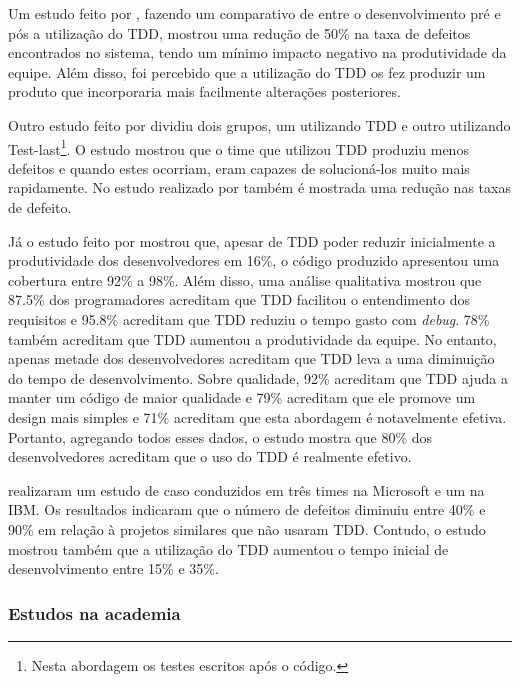Um estudo feito por , fazendo um comparativo de entre o desenvolvimento pré e pós a utilização do TDD, mostrou uma redução de 50\% na taxa de defeitos encontrados no sistema, tendo um mínimo impacto negativo na produtividade da equipe. Além disso, foi percebido que a utilização do TDD os fez produzir um produto que incorporaria mais facilmente alterações posteriores.

Outro estudo feito por  dividiu dois grupos, um utilizando TDD e outro utilizando Test-last\footnote{Nesta abordagem os testes escritos após o código.}. O estudo mostrou que o time que utilizou TDD produziu menos defeitos e quando estes ocorriam, eram capazes de solucioná-los muito mais rapidamente. No estudo realizado por  também é mostrada uma redução nas taxas de defeito.

Já o estudo feito por  mostrou que, apesar de TDD poder reduzir inicialmente a produtividade dos desenvolvedores em 16\%, o código produzido apresentou uma cobertura entre 92\% a 98\%. Além disso, uma análise qualitativa mostrou que 87.5\% dos programadores acreditam que TDD facilitou o entendimento dos requisitos e 95.8\% acreditam que TDD reduziu o tempo gasto com \textit{debug}. 78\% também acreditam que TDD aumentou a produtividade da equipe. No entanto, apenas metade dos desenvolvedores acreditam que TDD leva a uma diminuição do tempo de desenvolvimento. Sobre qualidade, 92\% acreditam que TDD ajuda a manter um código de maior qualidade e 79\% acreditam que ele promove um design mais simples e 71\% acreditam que esta abordagem é notavelmente efetiva. Portanto, agregando todos esses dados, o estudo mostra que 80\% dos desenvolvedores acreditam que o uso do TDD é realmente efetivo.

 realizaram um estudo de caso conduzidos em três times na Microsoft e um na IBM. Os resultados indicaram que o número de defeitos diminuiu entre 40\% e 90\% em relação à projetos similares que não usaram TDD. Contudo, o estudo mostrou também que a utilização do TDD aumentou o tempo inicial de desenvolvimento entre 15\% e 35\%.


\subsubsection{Estudos na academia} %
\label{sub:estudos_na_academia}

